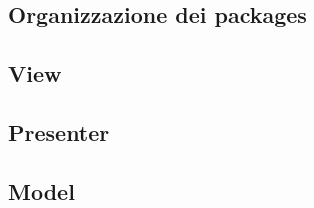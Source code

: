 \subsection{Organizzazione dei packages}

\newpage

\subsection{View}

\newpage
\subsection{Presenter}

\newpage
\subsection{Model}

\newpage
